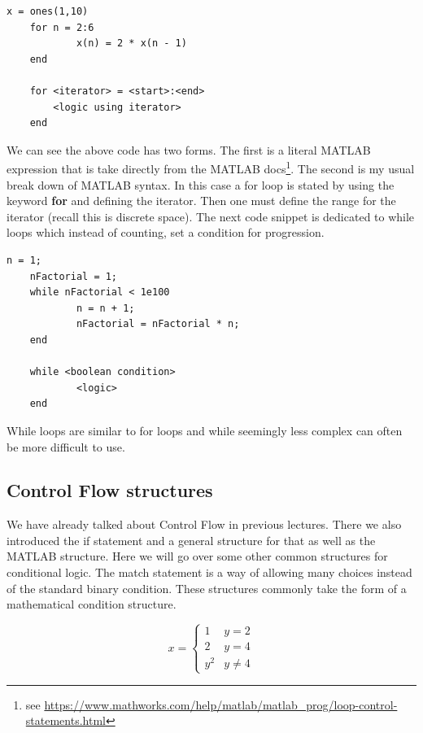 \documentclass[12pt]{article}
\begin{document}
				\pagebreak

				\begin{lstlisting}[style=pseudocode]
	x = ones(1,10)
	for n = 2:6
			x(n) = 2 * x(n - 1)
	end

	for <iterator> = <start>:<end>
		<logic using iterator>
	end
				\end{lstlisting}
				
				We can see the above code has two forms.
				The first is a literal MATLAB expression that is take directly from the MATLAB docs\footnote{
					see \url{https://www.mathworks.com/help/matlab/matlab_prog/loop-control-statements.html}
				}.
				The second is my usual break down of MATLAB syntax.
				In this case a for loop is stated by using the keyword \textbf{for}
					and defining the iterator.
				Then one must define the range for the iterator (recall this is discrete space).
				The next code snippet is dedicated to while loops which instead of counting,
					set a condition for progression.

				\begin{lstlisting}[style=pseudocode]
	n = 1;
	nFactorial = 1;
	while nFactorial < 1e100
			n = n + 1;
			nFactorial = nFactorial * n;
	end

	while <boolean condition>
			<logic>
	end
				\end{lstlisting}

				While loops are similar to for loops and while seemingly less complex can often be more difficult to use.

			\subsection{Control Flow structures}
				We have already talked about Control Flow in previous lectures.
				There we also introduced the if statement and a general structure for that as well as the MATLAB structure.
				Here we will go over some other common structures for conditional logic.
				The match statement is a way of allowing many choices instead of the standard binary condition.
				These structures commonly take the form of a mathematical condition structure.

				\begin{equation} \label{math_cases}
					x =
					\begin{cases}
						1 & y = 2 \\
						2 & y = 4 \\
						y^2 & y \neq 4
					\end{cases}
				\end{equation}
\end{document}

